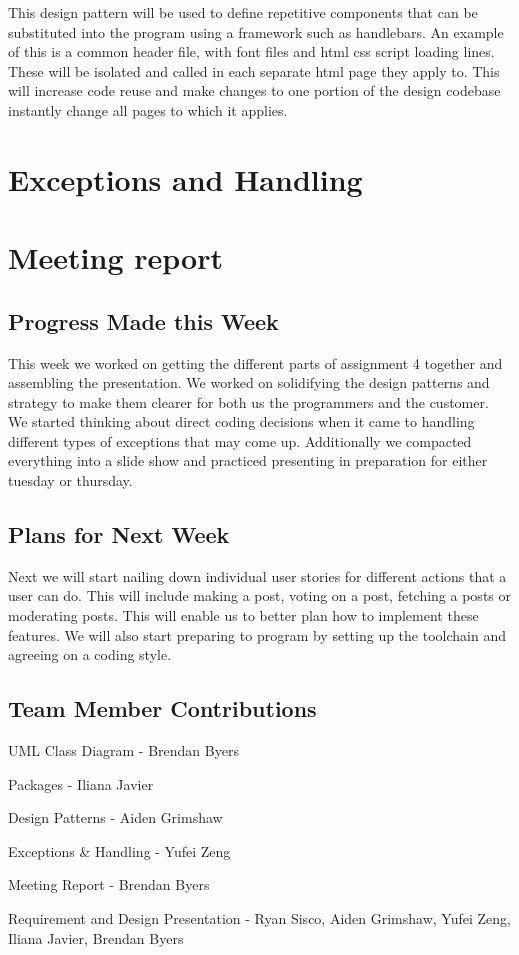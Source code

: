 \documentclass[12pt]{article}
\begin{document}
This design pattern will be used to define repetitive components that can be substituted into the program using a framework such as handlebars. An example of this is a common header file, with font files and html css script loading lines. These will be isolated and called in each separate html page they apply to. This will increase code reuse and make changes to one portion of the design codebase instantly change all pages to which it applies.

\section{Exceptions and Handling}

\section{Meeting report}
\subsection{Progress Made this Week}

This week we worked on getting the different parts of assignment 4 together and assembling the presentation.  We worked on solidifying the design patterns and strategy to make them clearer for both us the programmers and the customer.  We started thinking about direct coding decisions when it came to handling different types of exceptions that may come up.  Additionally we compacted everything into a slide show and practiced presenting in preparation for either tuesday or thursday.

\subsection{Plans for Next Week}

Next we will start nailing down individual user stories for different actions that a user can do.  This will include making a post, voting on a post, fetching a posts or moderating posts.  This will enable us to better plan how to implement these features.  We will also start preparing to program by setting up the toolchain and agreeing on a coding style.

\subsection{Team Member Contributions}

UML Class Diagram - Brendan Byers

Packages - Iliana Javier

Design Patterns - Aiden Grimshaw

Exceptions & Handling - Yufei Zeng

Meeting Report - Brendan Byers

Requirement and Design Presentation - Ryan Sisco, Aiden Grimshaw, Yufei Zeng, Iliana Javier, Brendan Byers 
\end{document}
